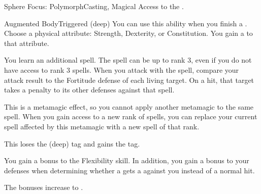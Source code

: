   \begin{magicalfeat}{Sphere Focus: Polymorph}{Casting, Magical}
    \featpre Access to the  .

    \begin{magicalattuneability}{Augmented Body}{Triggered}
      \abilitytags {} (deep)
      \rankline
      You can use this ability when you finish a .
      Choose a physical attribute: Strength, Dexterity, or Constitution.
      You gain a   to that attribute.
    \end{magicalattuneability}

     You learn an additional spell.
    The spell can be up to rank 3, even if you do not have access to rank 3 spells.
    When you attack with the spell, compare your attack result to the Fortitude defense of each living target.
    On a hit, that target takes a  penalty to its other defenses against that spell.

    This is a metamagic effect, so you cannot apply another metamagic to the same spell.
    When you gain access to a new rank of spells, you can replace your current spell affected by this metamagic with a new spell of that rank.

     This loses the  (deep) tag and gains the  tag.

     You gain a  bonus to the Flexibility skill.
    In addition, you gain a  bonus to your defenses when determining whether a  gets a  against you instead of a normal hit.

     The bonuses increase to .
  \end{magicalfeat}

